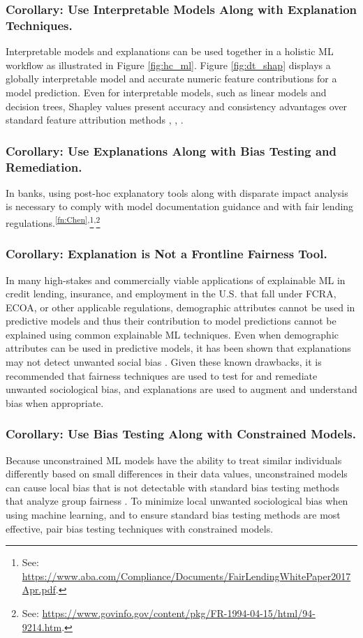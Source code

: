 \documentclass[sigconf]{acmart}
\begin{document}
\subsubsection{Corollary: Use Interpretable Models Along with Explanation Techniques.} Interpretable models and explanations can be used together in a holistic ML workflow as illustrated in Figure \ref{fig:hc_ml}. Figure \ref{fig:dt_shap} displays a globally interpretable model and accurate numeric feature contributions for a model prediction. Even for interpretable models, such as linear models and decision trees, Shapley values present accuracy and consistency advantages over standard feature attribution methods \cite{lipovetsky2001analysis}, \cite{tree_shap}, \cite{shapley}. 

\subsubsection{Corollary: Use Explanations Along with Bias Testing and Remediation.} In banks, using post-hoc explanatory tools along with disparate impact analysis is necessary to comply with model documentation guidance and with fair lending regulations.\textsuperscript{\ref{fn:Chen},}\footnote{\scriptsize{See: \url{https://www.aba.com/Compliance/Documents/FairLendingWhitePaper2017Apr.pdf}.}}\textsuperscript{,}\footnote{\scriptsize{See: \url{https://www.govinfo.gov/content/pkg/FR-1994-04-15/html/94-9214.htm}.}} 

\subsubsection{Corollary: Explanation is Not a Frontline Fairness Tool.} In many high-stakes and commercially viable applications of explainable ML in credit lending, insurance, and employment in the U.S. that fall under FCRA, ECOA, or other applicable regulations, demographic attributes cannot be used in predictive models and thus their contribution to model predictions cannot be explained using common explainable ML techniques. Even when demographic attributes can be used in predictive models, it has been shown that explanations may not detect unwanted social bias \cite{fair_washing}. Given these known drawbacks, it is recommended that fairness techniques are used to test for and remediate unwanted sociological bias, and explanations are used to augment and understand bias when appropriate.  

\subsubsection{Corollary: Use Bias Testing  Along with Constrained Models.} Because unconstrained ML models have the ability to treat similar individuals differently based on small differences in their data values, unconstrained models can cause local bias that is not detectable with standard bias testing methods that analyze group fairness \cite{dwork2012fairness}. To minimize local unwanted sociological bias when using machine learning, and to ensure standard bias testing methods are most effective, pair bias testing techniques with constrained models.
\end{document}
